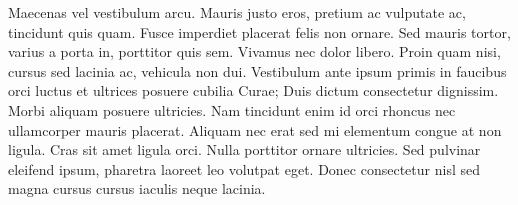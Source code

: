 Maecenas vel vestibulum arcu. Mauris justo eros, pretium ac vulputate ac, tincidunt quis quam. Fusce imperdiet placerat felis non ornare. Sed mauris tortor, varius a porta in, porttitor quis sem. Vivamus nec dolor libero. Proin quam nisi, cursus sed lacinia ac, vehicula non dui. Vestibulum ante ipsum primis in faucibus orci luctus et ultrices posuere cubilia Curae; Duis dictum consectetur dignissim. Morbi aliquam posuere ultricies. Nam tincidunt enim id orci rhoncus nec ullamcorper mauris placerat. Aliquam nec erat sed mi elementum congue at non ligula. Cras sit amet ligula orci. Nulla porttitor ornare ultricies. Sed pulvinar eleifend ipsum, pharetra laoreet leo volutpat eget. Donec consectetur nisl sed magna cursus cursus iaculis neque lacinia. 